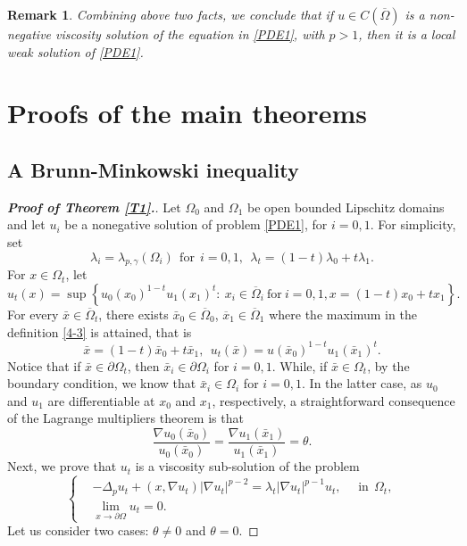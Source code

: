 \documentclass[12pt]{amsart}
\newtheorem{remark}[theorem]{Remark}
\newcommand{\1}{\mathbf 1}
\begin{document}
\begin{remark}
Combining above two facts, we conclude that if $u\in C(\overline{\Omega})$ is a non-negative viscosity solution of the equation in \eqref{PDE1}, with $p>1$, then it is a local weak solution of \eqref{PDE1}.
\end{remark}

\section{Proofs of the main theorems}\label{Se4}


\subsection{A Brunn-Minkowski inequality}

\begin{proof}[\bf Proof of Theorem \ref{T1}.]
Let $\Omega_0$ and $\Omega_1$ be open bounded Lipschitz domains and let $u_i$ be a nonegative solution of problem \eqref{PDE1}, for $i=0,1$.
For simplicity, set
\begin{equation}\label{4-2}
\lambda_i=\lambda_{p,\gamma}(\Omega_i)\ \ \mathrm{for}\ \ i=0,1,\ \ \lambda_t=(1-t)\lambda_0+t\lambda_1.
\end{equation}
For $x\in \Omega_t$, let
\begin{equation}\label{4-3}
u_t(x)=\sup \left\{ u_0(x_0)^{1-t}u_1(x_1)^t:\ x_i \in \overline{\Omega}_i\ \text{for}\ i=0,1, x=(1-t)x_0+tx_1\right\}.
\end{equation}
For every $\bar{x}\in \overline{\Omega}_t$, there exists $\bar{x}_0\in \overline{\Omega}_0$, $\overline{x}_1\in \overline{\Omega}_1$ where the maximum in the definition \eqref{4-3} is attained, that is
\begin{equation}\label{4-4}
\bar{x}=(1-t)\bar{x}_0+t\bar{x}_1, \ \ u_t(\bar{x})=u(\bar{x}_0)^{1-t}u_1(\bar{x}_1)^t.
\end{equation}
Notice that if $\bar{x}\in \partial \Omega_t$, then $\bar{x}_i\in \partial \Omega_i$ for $i=0,1$. While, if $\bar{x}\in \Omega_t$,  by the boundary condition, we know that  $\bar{x}_i \in \Omega_i$ for $i=0,1$. In the latter case, as $u_0$ and $u_1$ are differentiable at $x_0$ and $x_1$, respectively, a straightforward consequence of the Lagrange multipliers theorem is that
\begin{equation}\label{4-5}
\frac{\nabla u_0(\bar{x}_0)}{u_0(\bar{x}_0)}=\frac{\nabla u_1(\bar{x}_1)}{u_1(\bar{x}_1)}=\theta.
\end{equation}
Next, we prove that $u_t$ is a viscosity sub-solution of the problem
\begin{equation}\label{4-6}
\left\{
\begin{aligned}
& -\Delta_p u_t+(x,\nabla u_t)|\nabla u_t|^{p-2}=\lambda_t|\nabla u_t|^{p-1}u_t, \ \ \ \ \ \  \mathrm {in} \ \ \Omega_t  ,  \\
& \mathop {\lim}_{x\rightarrow \partial \Omega} u_t=0.
\end{aligned}
\right.
\end{equation}
Let us consider two cases: $\theta\neq 0$ and $\theta=0$.


\end{proof}
\end{document}
